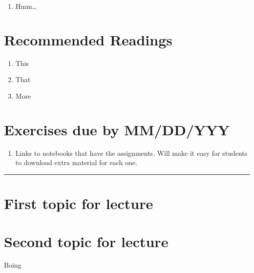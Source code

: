 \documentclass[]{book}
\providecommand{\tightlist}{%
  \setlength{\itemsep}{0pt}\setlength{\parskip}{0pt}}
\begin{document}
\begin{enumerate}
\def\labelenumi{\arabic{enumi}.}
\tightlist
\item
  Hmm\ldots{}
\end{enumerate}

\hypertarget{recommended-readings-5}{%
\section*{Recommended Readings}\label{recommended-readings-5}}

\begin{enumerate}
\def\labelenumi{\arabic{enumi}.}
\tightlist
\item
  This
\item
  That
\item
  More
\end{enumerate}

\hypertarget{exercises-due-by-mmddyyy-5}{%
\section*{Exercises due by MM/DD/YYY}\label{exercises-due-by-mmddyyy-5}}

\begin{enumerate}
\def\labelenumi{\arabic{enumi}.}
\tightlist
\item
  Links to notebooks that have the assignments. Will make it
  easy for students to download extra material for each one.
\end{enumerate}

\begin{center}\rule{0.5\linewidth}{\linethickness}\end{center}

\hypertarget{first-topic-for-lecture-5}{%
\section{First topic for lecture}\label{first-topic-for-lecture-5}}

\hypertarget{second-topic-for-lecture-5}{%
\section{Second topic for lecture}\label{second-topic-for-lecture-5}}

Boing


\end{document}
